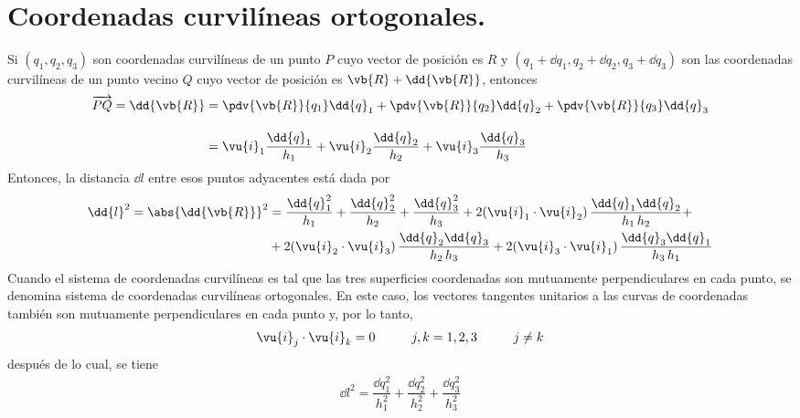 \section{Coordenadas curvilíneas ortogonales.}
Si $(q_{1}, q_{2}, q_{3})$ son coordenadas curvilíneas de un punto $P$ cuyo vector de posición es $R$ y $(q_{1} + \dd{q_{1}}, q_{2} + \dd{q_{2}}, q_{3} + \dd{q_{3}})$ son las coordenadas curvilíneas de un punto vecino $Q$ cuyo vector de posición es $\vb{R} + \dd{\vb{R}}$, entonces
\begin{align}
\begin{aligned}
\overrightarrow{PQ} = \dd{\vb{R}} &= \pdv{\vb{R}}{q_{1}} \dd{q}_{1} + \pdv{\vb{R}}{q_{2}} \dd{q}_{2} + \pdv{\vb{R}}{q_{3}} \dd{q}_{3} \\[1em]
&= \vu{i}_{1} \dfrac{\dd{q}_{1}}{h_{1}} + \vu{i}_{2} \dfrac{\dd{q}_{2}}{h_{2}} + \vu{i}_{3} \dfrac{\dd{q}_{3}}{h_{3}} 
\end{aligned}
\label{eq:ecuacion_A_02_01}
\end{align}
Entonces, la distancia $\dd{l}$ entre esos puntos adyacentes está dada por
\begin{align}
\begin{aligned}
\dd{l}^{2} = \abs{\dd{\vb{R}}}^{2} &= \dfrac{\dd{q}_{1}^{2}}{h_{1}} + \dfrac{\dd{q}_{2}^{2}}{h_{2}} + \dfrac{\dd{q}_{3}^{2}}{h_{3}} + 2 (\vu{i}_{1} \cdot \vu{i}_{2}) \, \dfrac{\dd{q}_{1} \dd{q}_{2}}{h_{1} \, h_{2}} + \\
&+ 2 (\vu{i}_{2} \cdot \vu{i}_{3}) \, \dfrac{\dd{q}_{2} \dd{q}_{3}}{h_{2} \, h_{3}} + 2 (\vu{i}_{3} \cdot \vu{i}_{1}) \, \dfrac{\dd{q}_{3} \dd{q}_{1}}{h_{3} \, h_{1}}
\end{aligned}
\label{eq:ecuacion_A_02_02}
\end{align}
Cuando el sistema de coordenadas curvilíneas es tal que las tres superficies coordenadas son mutuamente perpendiculares en cada punto, se denomina sistema de coordenadas curvilíneas ortogonales. En este caso, los vectores tangentes unitarios a las curvas de coordenadas también son mutuamente perpendiculares en cada punto y, por lo tanto,
\begin{align}
\vu{i}_{j} \cdot \vu{i}_{k} = 0 \hspace{1cm} j, k = 1, 2, 3 \hspace{1cm} j \neq k
\label{eq:ecuacion_A_02_03}    
\end{align}
después de lo cual, se tiene
\begin{align}
\dd{l}^{2} = \dfrac{\dd{q}_{1}^{2}}{h_{1}^{2}} + \dfrac{\dd{q}_{2}^{2}}{h_{2}^{2}} + \dfrac{\dd{q}_{3}^{2}}{h_{3}^{2}}
\label{eq:ecuacion_A_02_04}    
\end{align}
